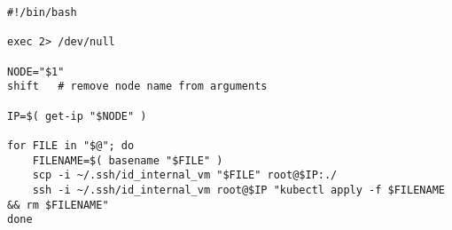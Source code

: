 \begin{verbatim}
#!/bin/bash

exec 2> /dev/null

NODE="$1"
shift   # remove node name from arguments

IP=$( get-ip "$NODE" )

for FILE in "$@"; do
    FILENAME=$( basename "$FILE" )
    scp -i ~/.ssh/id_internal_vm "$FILE" root@$IP:./
    ssh -i ~/.ssh/id_internal_vm root@$IP "kubectl apply -f $FILENAME && rm $FILENAME"
done
\end{verbatim}